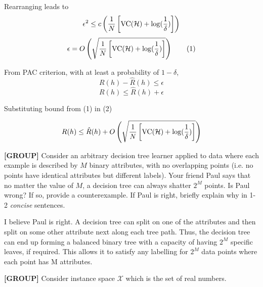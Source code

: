 \documentclass[11pt,addpoints,answers]{exam}
\newcommand{\Xc}{\mathcal{X}}
\newcommand{\group}{\textbf{[GROUP]} }
\begin{document}
\begin{questions}
\begin{your_solution}[height=12cm, width=14cm]
	Rearranging leads to 
	\[\epsilon^2 \leq c\left(\frac{1}{N} \left[\text{VC}(\mathcal{H}) + \log(\frac{1}{\delta}) \right] \right)\]
	\[\epsilon = O\left(\sqrt{\frac{1}{N} \left[\text{VC}(\mathcal{H}) + \log(\frac{1}{\delta}) \right] }\right) \tag{1}\]
	
	From PAC criterion, with at least a probability of $1 - \delta$,
	\[R(h) - \hat{R}(h) \leq \epsilon\]
	\[R(h) \leq \hat{R}(h) + \epsilon \tag{2}\]

Substituting bound from (1) in (2)

	\[R(h) \leq \hat{R}(h) + O\left(\sqrt{\frac{1}{N} \left[\text{VC}(\mathcal{H}) + \log(\frac{1}{\delta}) \right] }\right) \]


	
    
    \end{your_solution}
    
    
    
\question[3] \group Consider an arbitrary decision tree learner applied to data where each example is described by $M$ binary attributes, with no overlapping points (i.e. no points have identical attributes but different labels). Your friend Paul says that no matter the value of $M$, a decision tree can always shatter $2^M$ points. Is Paul wrong? If so, provide a counterexample. If Paul is right, briefly explain why in 1-2 \emph{concise} sentences.
    
    \begin{your_solution}[fit,height=4cm, width=14cm]    
    I believe Paul is right. A decision tree can split on one of the attributes and then split on some other attribute next along each tree path. Thus, the decision tree can end up forming a balanced binary tree with a capacity of having $2^M$ specific leaves, if required. This allows it to satisfy any labelling for $2^M$ data points where each point has M attributes.
    \end{your_solution}   
    
    
    
\question \group Consider instance space $\Xc$ which is the set of real numbers. 
\begin{parts}

\end{parts}
\end{questions}
\end{document}
